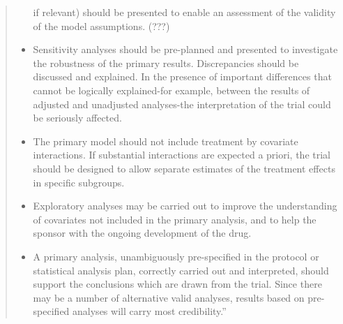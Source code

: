 \begin{quote}
\begin{itemize}
if relevant) should be presented to enable an assessment of the validity
of the model assumptions. (???)
\item Sensitivity analyses should be pre-planned and presented to
investigate the robustness of the primary results.  Discrepancies should
be discussed and explained.  In the presence of important differences
that cannot be logically explained-for example, between the results of
adjusted and unadjusted analyses-the interpretation of the trial could
be seriously affected.
\item The primary model should not include treatment by covariate
interactions.  If substantial interactions are expected a priori, the
trial should be designed to allow separate estimates of the treatment
effects in specific subgroups.
\item Exploratory analyses may be carried out to improve the understanding
of covariates not included in the primary analysis, and to help the
sponsor with the ongoing development of the drug.
\item A primary analysis, unambiguously pre-specified in the protocol or
statistical analysis plan, correctly carried out and interpreted, should
support the conclusions which are drawn from the trial.  Since there may
be a number of alternative valid analyses, results based on
pre-specified analyses will carry most credibility.''
\end{itemize}
  \end{quote}


